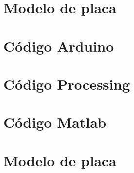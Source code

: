 \newpage
\section{Modelo de placa}
\newpage
\section{Código Arduino}
\newpage
\section{Código Processing}
\newpage
\section{Código Matlab}
\newpage
\section{Modelo de placa}

